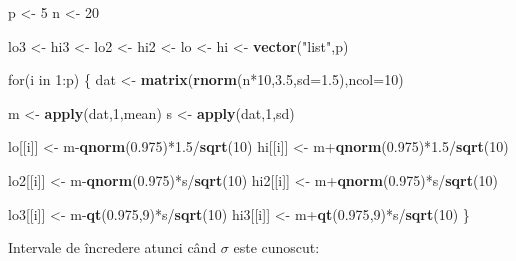 \documentclass[]{article}
\newenvironment{Shaded}{\begin{snugshade}}{\end{snugshade}}
\newcommand{\KeywordTok}[1]{\textcolor[rgb]{0.13,0.29,0.53}{\textbf{{#1}}}}
\newcommand{\DataTypeTok}[1]{\textcolor[rgb]{0.13,0.29,0.53}{{#1}}}
\newcommand{\DecValTok}[1]{\textcolor[rgb]{0.00,0.00,0.81}{{#1}}}
\newcommand{\FloatTok}[1]{\textcolor[rgb]{0.00,0.00,0.81}{{#1}}}
\newcommand{\StringTok}[1]{\textcolor[rgb]{0.31,0.60,0.02}{{#1}}}
\newcommand{\NormalTok}[1]{{#1}}
\begin{document}
\begin{Shaded}
\begin{Highlighting}[]
\NormalTok{p <-}\StringTok{ }\DecValTok{5}
\NormalTok{n <-}\StringTok{ }\DecValTok{20}

\NormalTok{lo3 <-}\StringTok{ }\NormalTok{hi3 <-}\StringTok{ }\NormalTok{lo2 <-}\StringTok{ }\NormalTok{hi2 <-}\StringTok{ }\NormalTok{lo <-}\StringTok{ }\NormalTok{hi <-}\StringTok{ }\KeywordTok{vector}\NormalTok{(}\StringTok{"list"}\NormalTok{,p)}

\NormalTok{for(i in }\DecValTok{1}\NormalTok{:p) \{}
  \NormalTok{dat <-}\StringTok{ }\KeywordTok{matrix}\NormalTok{(}\KeywordTok{rnorm}\NormalTok{(n*}\DecValTok{10}\NormalTok{,}\FloatTok{3.5}\NormalTok{,}\DataTypeTok{sd=}\FloatTok{1.5}\NormalTok{),}\DataTypeTok{ncol=}\DecValTok{10}\NormalTok{)}
  
  \NormalTok{m <-}\StringTok{ }\KeywordTok{apply}\NormalTok{(dat,}\DecValTok{1}\NormalTok{,mean)}
  \NormalTok{s <-}\StringTok{ }\KeywordTok{apply}\NormalTok{(dat,}\DecValTok{1}\NormalTok{,sd)}
  
  \NormalTok{lo[[i]] <-}\StringTok{ }\NormalTok{m-}\KeywordTok{qnorm}\NormalTok{(}\FloatTok{0.975}\NormalTok{)*}\FloatTok{1.5}\NormalTok{/}\KeywordTok{sqrt}\NormalTok{(}\DecValTok{10}\NormalTok{)}
  \NormalTok{hi[[i]] <-}\StringTok{ }\NormalTok{m+}\KeywordTok{qnorm}\NormalTok{(}\FloatTok{0.975}\NormalTok{)*}\FloatTok{1.5}\NormalTok{/}\KeywordTok{sqrt}\NormalTok{(}\DecValTok{10}\NormalTok{)}
  
  \NormalTok{lo2[[i]] <-}\StringTok{ }\NormalTok{m-}\KeywordTok{qnorm}\NormalTok{(}\FloatTok{0.975}\NormalTok{)*s/}\KeywordTok{sqrt}\NormalTok{(}\DecValTok{10}\NormalTok{)}
  \NormalTok{hi2[[i]] <-}\StringTok{ }\NormalTok{m+}\KeywordTok{qnorm}\NormalTok{(}\FloatTok{0.975}\NormalTok{)*s/}\KeywordTok{sqrt}\NormalTok{(}\DecValTok{10}\NormalTok{)}
  
  \NormalTok{lo3[[i]] <-}\StringTok{ }\NormalTok{m-}\KeywordTok{qt}\NormalTok{(}\FloatTok{0.975}\NormalTok{,}\DecValTok{9}\NormalTok{)*s/}\KeywordTok{sqrt}\NormalTok{(}\DecValTok{10}\NormalTok{)}
  \NormalTok{hi3[[i]] <-}\StringTok{ }\NormalTok{m+}\KeywordTok{qt}\NormalTok{(}\FloatTok{0.975}\NormalTok{,}\DecValTok{9}\NormalTok{)*s/}\KeywordTok{sqrt}\NormalTok{(}\DecValTok{10}\NormalTok{)}
\NormalTok{\}}
\end{Highlighting}
\end{Shaded}

Intervale de încredere atunci când \(\sigma\) este cunoscut:
\end{document}
